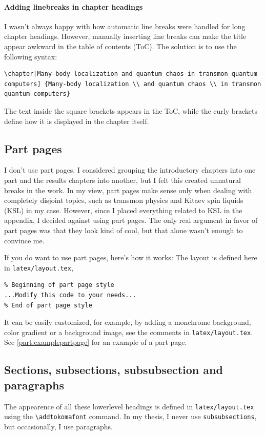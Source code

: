 \paragraph{Adding linebreaks in chapter headings}
I wasn’t always happy with how automatic line breaks were handled for long chapter headings. However, manually inserting line breaks can make the title appear awkward in the table of contents (ToC). The solution is to use the following syntax:
\begin{lstlisting}
\chapter[Many-body localization and quantum chaos in transmon quantum computers] {Many-body localization \\ and quantum chaos \\ in transmon quantum computers}
\end{lstlisting}
The text inside the square brackets appears in the ToC, while the curly brackets define how it is displayed in the chapter itself.

\subsection{Part pages}
I don't use part pages. I considered grouping the introductory chapters into one part and the results chapters into another, but I felt this created unnatural breaks in the work. In my view, part pages make sense only when dealing with completely disjoint topics, such as transmon physics and Kitaev spin liquids (KSL) in my case. However, since I placed everything related to KSL in the appendix, I decided against using part pages.
The only real argument in favor of part pages was that they look kind of cool, but that alone wasn’t enough to convince me.

If you do want to use part pages, here’s how it works: The layout is defined here in \verb|latex/layout.tex|,
\begin{lstlisting}
% Beginning of part page style 
...Modify this code to your needs...
% End of part page style 
\end{lstlisting}
It can be easily customized, for example, by adding a monchrome background, color gradient or a background image, see the comments in \verb|latex/layout.tex|. See \ref{part:examplepartpage} for an example of a part page.

\subsection{Sections, subsections, subsubsection and paragraphs}
The appearence of all these lowerlevel headings is defined in \verb|latex/layout.tex| using the \verb|\addtokomafont| command. In my thesis, I never use \verb|subsubsections|, but occasionally, I use paragraphs.

